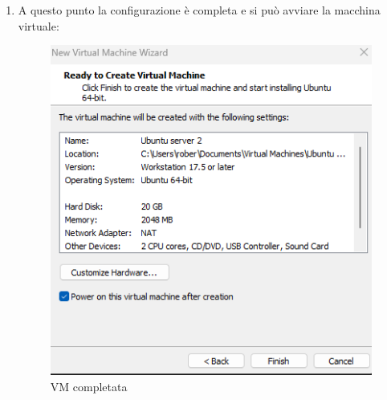 \documentclass[12pt,a4paper,twoside]{book}
\begin{document}
\begin{enumerate}
\begin{figure}[H]
    \end{figure}
    \item A questo punto la configurazione è completa e si può avviare la macchina virtuale:
    \begin{figure}[H]
        \centering
        \includegraphics[width=.7\linewidth]{tesi/img/configurazione_VM_completa.png}
        \caption{VM completata}
        \label{fig:configurazione_VM_completa}
    \end{figure}
\end{enumerate}
\end{document}
